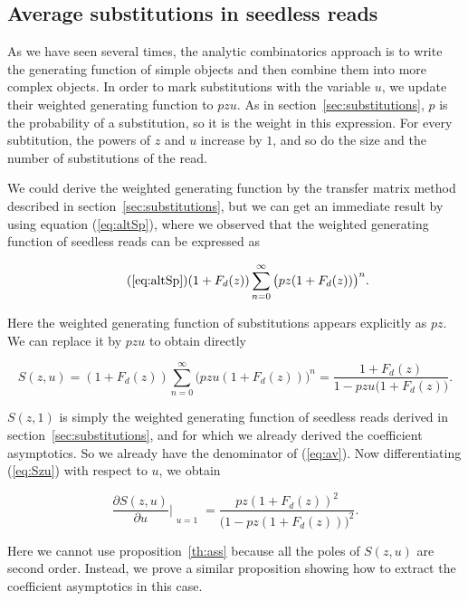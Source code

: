 \documentclass{article}
\begin{document}
\subsection{Average substitutions in seedless reads}
\label{sec:Szu}

As we have seen several times, the analytic combinatorics approach is to
write the generating function of simple objects and then combine them into
more complex objects. In order to mark substitutions with the variable
$u$, we update their weighted generating function to $pzu$. As in
section~\ref{sec:substitutions}, $p$ is the probability of a substitution,
so it is the weight in this expression. For every subtitution, the powers
of $z$ and $u$ increase by $1$, and so do the size and the number of
substitutions of the read.

We could derive the weighted generating function by the transfer matrix
method described in section~\ref{sec:substitutions}, but we can get an
immediate result by using equation (\ref{eq:altSp}), where we observed
that the weighted generating function of seedless reads can be expressed
as

\begin{equation}
\tag{\ref{eq:altSp}}
(1+F_d(z)) \sum_{n=0}^\infty \big( pz(1+F_d(z)) \big)^n.
\end{equation}

Here the weighted generating function of substitutions appears explicitly
as $pz$. We can replace it by $pzu$ to obtain directly

\begin{equation}
\label{eq:Szu}
S(z,u) = (1+F_d(z)) \sum_{n=0}^\infty \big( pzu(1+F_d(z)) \big)^n
= \frac{1+F_d(z)}{1-pzu\big( 1+F_d(z) \big)}.
\end{equation}


$S(z,1)$ is simply the weighted generating function of seedless reads
derived in section~\ref{sec:substitutions}, and for which we already
derived the coefficient asymptotics. So we already have the denominator of
(\ref{eq:av}). Now differentiating (\ref{eq:Szu}) with respect to $u$, we
obtain

\begin{equation}
\label{eq:dSdu}
\frac{\partial S(z,u)}{\partial u} \Bigr|_{\substack{\\u=1}} = 
\frac{pz(1+F_d(z))^2}{\big( 1 - pz(1+F_d(z)) \big)^2}.
\end{equation}

Here we cannot use proposition~\ref{th:ass} because all the poles of
$S(z,u)$ are second order. Instead, we prove a similar proposition showing
how to extract the coefficient asymptotics in this case.
\end{document}
